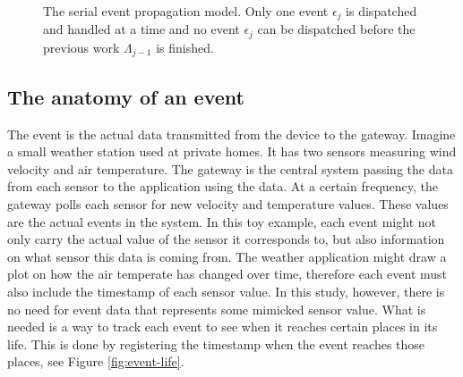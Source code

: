 \begin{figure}[h!]
    \caption{The serial event propagation model. Only one event $\epsilon_j$ is
    dispatched and handled at a time and no event $\epsilon_j$ can be
    dispatched before the previous work $\Lambda_{j-1}$ is finished.}
    \label{fig:event-propagation-serial}
\end{figure}

\subsection{The anatomy of an event}

The event is the actual data transmitted from the device to the gateway.
Imagine a small weather station used at private homes. It has two sensors
measuring wind velocity and air temperature. The gateway is the central system
passing the data from each sensor to the application using the data. At a
certain frequency, the gateway polls each sensor for new velocity and
temperature values. These values are the actual events in the system. In this
toy example, each event might not only carry the actual value of the sensor it
corresponds to, but also information on what sensor this data is coming from.
The weather application might draw a plot on how the air temperate has changed
over time, therefore each event must also include the timestamp of each sensor
value. In this study, however, there is no need for event data that represents
some mimicked sensor value. What is needed is a way to track each event to see
when it reaches certain places in its life. This is done by registering the
timestamp when the event reaches those places, see Figure \ref{fig:event-life}.

